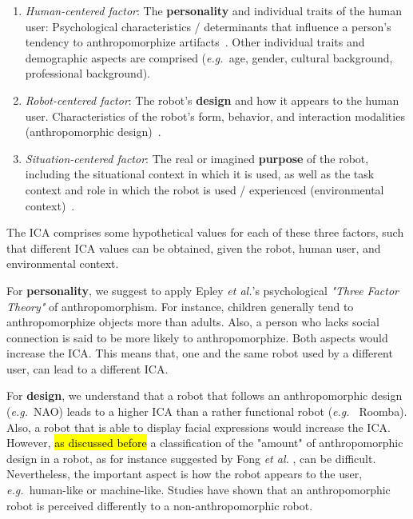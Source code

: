 \documentclass{frontiersSCNS} %
\newcommand{\eg}{{\textit{e.g.~}}}
\begin{document}
\begin{enumerate}

    \item \emph{Human-centered factor}: The \textbf{personality} and individual
        traits of the human user: Psychological characteristics / determinants
        that influence a person's tendency to anthropomorphize
        artifacts~\cite{epley_seeing_2007}. Other individual traits and
        demographic aspects are comprised (\eg age, gender, cultural background,
        professional background).

    \item \emph{Robot-centered factor}: The robot's \textbf{design} and how it
        appears to the human user. Characteristics of the robot's form,
        behavior, and interaction modalities (anthropomorphic
        design)~\cite{fong_survey_2003}.

    \item \emph{Situation-centered factor}: The real or imagined
        \textbf{purpose} of the robot, including the situational context in
        which it is used, as well as the task context and role in which the
        robot is used / experienced (environmental
        context)~\cite{joosse_what_2013}.

\end{enumerate}	

The ICA comprises some hypothetical values for each of these three factors, such
that different ICA values can be obtained, given the robot, human user, and
environmental context.

For \textbf{personality}, we suggest to apply Epley \textit{et al.}'s
\cite{epley_seeing_2007} psychological \textit{"Three Factor Theory"} of
anthropomorphism. For instance, children generally tend to anthropomorphize
objects more than adults. Also, a person who lacks social connection is said to
be more likely to anthropomorphize. Both aspects would increase the ICA. This
means that, one and the same robot used by a different user, can lead to a
different ICA.

For \textbf{design}, we understand that a robot that follows an anthropomorphic
design (\eg NAO) leads to a higher ICA than a rather functional robot (\eg
Roomba). Also, a robot that is able to display facial expressions would increase
the ICA. However, \hl{as discussed before} a classification of the "amount" of
anthropomorphic design in a robot, as for instance suggested by Fong \textit{et
al.} \cite{fong_survey_2003}, can be difficult. Nevertheless, the important
aspect is how the robot appears to the user, \eg human-like or machine-like.
Studies have shown that an anthropomorphic robot is perceived differently to a
non-anthropomorphic robot.
\end{document}
